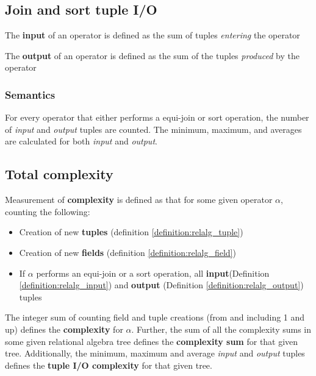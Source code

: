 \subsection{Join and sort tuple I/O}
\begin{myDefinition}
The \textbf{input} of an operator is defined as the sum of tuples \emph{entering} the
operator
\label{definition:relalg_input}
\end{myDefinition}

\begin{myDefinition}
The \textbf{output} of an operator is defined as the sum of the tuples \emph{produced}
by the operator
\label{definition:relalg_output}
\end{myDefinition}

\subsubsection{Semantics}
For every operator that either performs a equi-join or sort operation, the
number of \textit{input} and \textit{output} tuples are counted. The minimum, maximum,
and averages are calculated for both \textit{input} and \textit{output}.

\subsection{Total complexity}
\begin{myDefinition}
Measurement of \textbf{complexity} is defined as that for some given
operator $\alpha$, counting the following:
\begin{itemize}
  \item Creation of new \textbf{tuples} (definition
  \ref{definition:relalg_tuple})
  \item Creation of new \textbf{fields} (definition
  \ref{definition:relalg_field})
  \item If $\alpha$ performs an equi-join or a sort operation, all
  \textbf{input}(Definition \ref{definition:relalg_input}) and \textbf{output}
  (Definition \ref{definition:relalg_output}) tuples
\end{itemize}
The integer sum of counting field and tuple creations (from and including 1 and
up) defines the \textbf{complexity} for $\alpha$. Further, the
sum of all the complexity sums in some given relational algebra tree defines the
\textbf{complexity sum} for that given tree. Additionally, the minimum, maximum
and average \textit{input} and \textit{output} tuples defines the
\textbf{tuple I/O complexity} for that given tree.
\label{definition:relalg_complexity}
\end{myDefinition}
